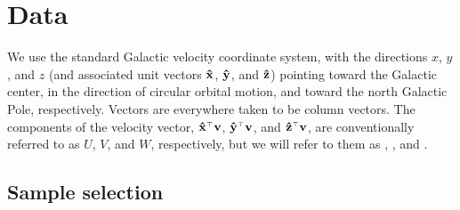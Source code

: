 \section{Data}

We use the standard Galactic velocity coordinate system,
with the directions $x$, $y$, and $z$ (and associated unit vectors
$\mathbf{\hat{x}}$, $\mathbf{\hat{y}}$, and $\mathbf{\hat{z}}$) pointing toward the Galactic center, in
the direction of circular orbital motion, and toward the north
Galactic Pole, respectively. Vectors are everywhere taken to be column
vectors. The components of the velocity vector, $\mathbf{\hat{x}}^{\scriptscriptstyle \top}\boldsymbol{\mathbf{v}}$,
$\mathbf{\hat{y}}^{\scriptscriptstyle \top}\boldsymbol{\mathbf{v}}$, and $\mathbf{\hat{z}}^{\scriptscriptstyle \top}\boldsymbol{\mathbf{v}}$, are conventionally referred to as $U$,
$V$, and $W$, respectively, but we will refer to them as \vx, \vy, and
\vz.


\subsection{Sample selection}

